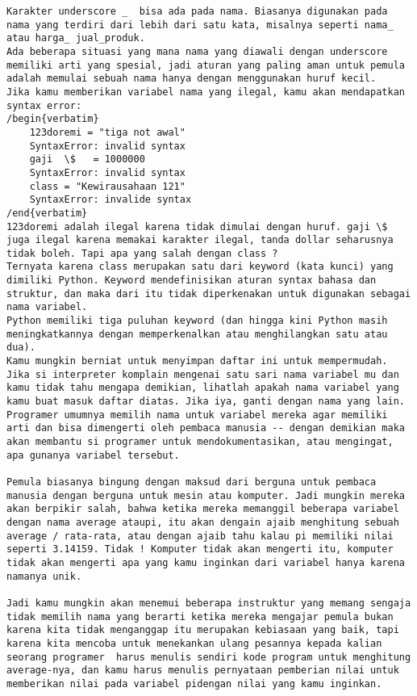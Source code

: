 \begin{verbatim}
Karakter underscore _  bisa ada pada nama. Biasanya digunakan pada nama yang terdiri dari lebih dari satu kata, misalnya seperti nama_ atau harga_ jual_produk.
Ada beberapa situasi yang mana nama yang diawali dengan underscore memiliki arti yang spesial, jadi aturan yang paling aman untuk pemula adalah memulai sebuah nama hanya dengan menggunakan huruf kecil.
Jika kamu memberikan variabel nama yang ilegal, kamu akan mendapatkan syntax error: 
/begin{verbatim}
	123doremi = "tiga not awal" 
	SyntaxError: invalid syntax 
	gaji  \$   = 1000000 
	SyntaxError: invalid syntax 
	class = "Kewirausahaan 121" 
	SyntaxError: invalide syntax 
/end{verbatim}
123doremi adalah ilegal karena tidak dimulai dengan huruf. gaji \$ juga ilegal karena memakai karakter ilegal, tanda dollar seharusnya tidak boleh. Tapi apa yang salah dengan class ?
Ternyata karena class merupakan satu dari keyword (kata kunci) yang dimiliki Python. Keyword mendefinisikan aturan syntax bahasa dan struktur, dan maka dari itu tidak diperkenakan untuk digunakan sebagai nama variabel. 
Python memiliki tiga puluhan keyword (dan hingga kini Python masih meningkatkannya dengan memperkenalkan atau menghilangkan satu atau dua). 
Kamu mungkin berniat untuk menyimpan daftar ini untuk mempermudah. Jika si interpreter komplain mengenai satu sari nama variabel mu dan kamu tidak tahu mengapa demikian, lihatlah apakah nama variabel yang kamu buat masuk daftar diatas. Jika iya, ganti dengan nama yang lain.  
Programer umumnya memilih nama untuk variabel mereka agar memiliki arti dan bisa dimengerti oleh pembaca manusia -- dengan demikian maka akan membantu si programer untuk mendokumentasikan, atau mengingat, apa gunanya variabel tersebut.  

Pemula biasanya bingung dengan maksud dari berguna untuk pembaca manusia dengan berguna untuk mesin atau komputer. Jadi mungkin mereka akan berpikir salah, bahwa ketika mereka memanggil beberapa variabel dengan nama average ataupi, itu akan dengain ajaib menghitung sebuah average / rata-rata, atau dengan ajaib tahu kalau pi memiliki nilai seperti 3.14159. Tidak ! Komputer tidak akan mengerti itu, komputer tidak akan mengerti apa yang kamu inginkan dari variabel hanya karena namanya unik. 

Jadi kamu mungkin akan menemui beberapa instruktur yang memang sengaja tidak memilih nama yang berarti ketika mereka mengajar pemula bukan karena kita tidak menganggap itu merupakan kebiasaan yang baik, tapi karena kita mencoba untuk menekankan ulang pesannya kepada kalian seorang programer  harus menulis sendiri kode program untuk menghitung average-nya, dan kamu harus menulis pernyataan pemberian nilai untuk memberikan nilai pada variabel pidengan nilai yang kamu inginkan. 


\end{verbatim}

